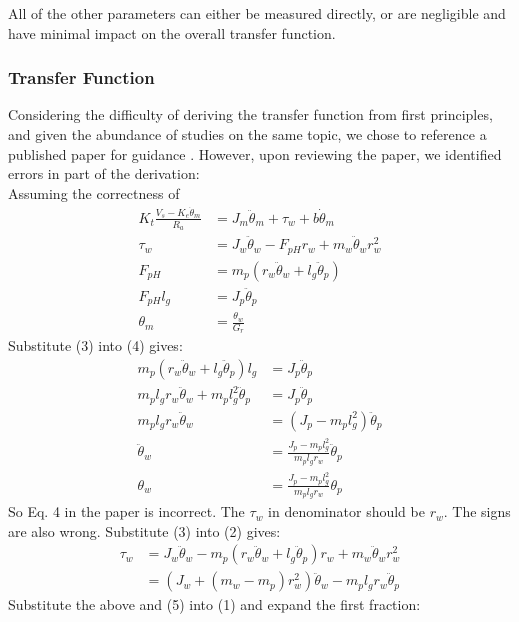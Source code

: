 \documentclass{article}
\begin{document}
All of the other parameters can either be measured directly, or are negligible
and have minimal impact on the overall transfer function. \\

\subsubsection{Transfer Function}

Considering the difficulty of deriving the transfer function from first
principles, and given the abundance of studies on the same topic, we chose to
reference a published paper for guidance \cite{suspaper}. However, upon
reviewing the paper, we identified errors in part of the derivation: \\

Assuming the correctness of
\begin{align}
K_t \frac{V_s - K_e \dot{\theta}_m}{R_a} &= J_m \ddot{\theta}_m + \tau_w + b \dot{\theta}_m \\
\tau_w &= J_w \ddot{\theta}_w - F_{pH} r_w + m_w \ddot{\theta}_w r_w^2 \\
F_{pH} &= m_p (r_w \ddot{\theta}_w + l_g \ddot{\theta}_p) \\
F_{pH} l_g &= J_p \ddot{\theta}_p \\
\theta_m &= \frac{\theta_w}{G_r}
\end{align}
Substitute (3) into (4) gives:
\begin{align*}
m_p (r_w \ddot{\theta}_w + l_g \ddot{\theta}_p) l_g &= J_p \ddot{\theta}_p \\
m_p l_g r_w \ddot{\theta}_w + m_p l_g^2 \ddot{\theta}_p &= J_p \ddot{\theta}_p \\
m_p l_g r_w \ddot{\theta}_w &= (J_p - m_p l_g^2) \ddot{\theta}_p \\
\ddot{\theta}_w &= \frac{J_p - m_p l_g^2}{m_p l_g r_w} \ddot{\theta}_p \\
\theta_w &= \frac{J_p - m_p l_g^2}{m_p l_g r_w} \theta_p
\end{align*}
So Eq. 4 in the paper is incorrect. The \(\tau_w\) in denominator should be \(r_w\). The signs are also wrong.
Substitute (3) into (2) gives:
\begin{align*}
\tau_w &= J_w \ddot{\theta}_w - m_p (r_w \ddot{\theta}_w + l_g \ddot{\theta}_p) r_w + m_w \ddot{\theta}_w r_w^2 \\
&= (J_w + (m_w - m_p) r_w^2) \ddot{\theta}_w - m_p l_g r_w \ddot{\theta}_p
\end{align*}
Substitute the above and (5) into (1) and expand the first fraction:
\end{document}
